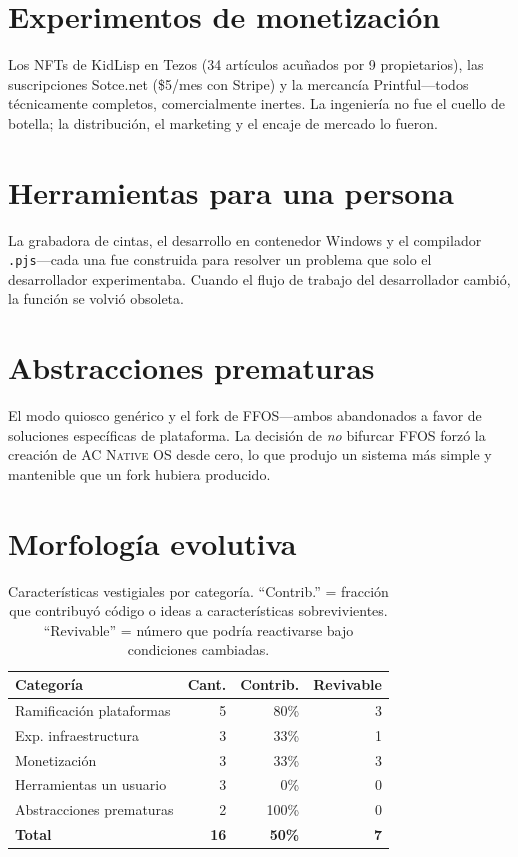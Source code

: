 \documentclass[10pt,letterpaper,twocolumn]{article}
\newcommand{\acos}{\textsc{AC Native OS}}
\begin{document}
\section{Experimentos de monetización}

Los NFTs de KidLisp en Tezos (34 artículos acuñados por 9 propietarios), las suscripciones Sotce.net (\$5/mes con Stripe) y la mercancía Printful---todos técnicamente completos, comercialmente inertes. La ingeniería no fue el cuello de botella; la distribución, el marketing y el encaje de mercado lo fueron.

\section{Herramientas para una persona}

La grabadora de cintas, el desarrollo en contenedor Windows y el compilador \texttt{.pjs}---cada una fue construida para resolver un problema que solo el desarrollador experimentaba. Cuando el flujo de trabajo del desarrollador cambió, la función se volvió obsoleta.

\section{Abstracciones prematuras}

El modo quiosco genérico y el fork de FFOS---ambos abandonados a favor de soluciones específicas de plataforma. La decisión de \emph{no} bifurcar FFOS forzó la creación de \acos{} desde cero, lo que produjo un sistema más simple y mantenible que un fork hubiera producido.

\section{Morfología evolutiva}

\begin{table}[h]
\small
\centering
\begin{tabularx}{\columnwidth}{Xrrr}
\toprule
\textbf{Categoría} & \textbf{Cant.} & \textbf{Contrib.} & \textbf{Revivable} \\
\midrule
Ramificación plataformas & 5 & 80\% & 3 \\
Exp. infraestructura & 3 & 33\% & 1 \\
Monetización & 3 & 33\% & 3 \\
Herramientas un usuario & 3 & 0\% & 0 \\
Abstracciones prematuras & 2 & 100\% & 0 \\
\midrule
\textbf{Total} & \textbf{16} & \textbf{50\%} & \textbf{7} \\
\bottomrule
\end{tabularx}
\caption{Características vestigiales por categoría. ``Contrib.'' = fracción que contribuyó código o ideas a características sobrevivientes. ``Revivable'' = número que podría reactivarse bajo condiciones cambiadas.}
\label{tab:vestigial}
\end{table}
\end{document}
